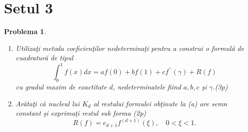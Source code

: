 \documentclass{article}%
\newtheorem{problem}[theorem]{Problema}
\begin{document}
\section*{Setul 3}

\begin{problem}
\label{pb4.21}

\begin{enumerate}
\item[(a)] Utiliza\c{t}i metoda coeficien\c{t}ilor nedetermina\c{t}i pentru a
construi o formul\u{a} de cuadratur\u{a} de tipul
\[
\int_{0}^{1}f(x)dx=af(0)+bf(1)+cf^{\prime\prime}(\gamma)+R(f)
\]
cu gradul maxim de exactitate $d$, nedeterminatele fiind $a,b,c$ \c{s}i
$\gamma$.(3p)

\item[(b)] Ar\u{a}ta\c{t}i c\u{a} nucleul lui $K_{d}$ al restului formulei
ob\c{t}inute la (a) are semn constant \c{s}i exprima\c{t}i restul sub forma
(2p)
\[
R(f)=e_{d+1}f^{(d+1)}(\xi),\quad0<\xi<1.
\]

\end{enumerate}
\end{problem}
\end{document}
